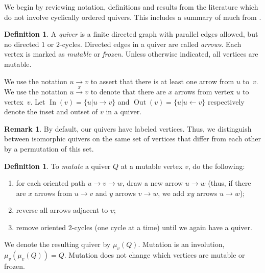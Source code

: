 \documentclass[11pt, letterpaper]{amsart}
\theoremstyle{definition}
\newtheorem{remark}[theorem]{Remark}
\newtheorem{definition}[theorem]{Definition}
\numberwithin{equation}{section}
\def\In{{\operatorname{In}}}
\def\Out{{\operatorname{Out}}}
\begin{document}
We begin by reviewing notation, definitions and results from the literature which do not involve cyclically ordered quivers.
This includes a summary of much from \cite{SevenAMatrices}. 



\begin{definition}
A \emph{quiver} is a finite directed graph with parallel edges allowed, but no directed $1$ or $2$-cycles.
Directed edges in a quiver are called \emph{arrows}.
Each vertex is marked as \emph{mutable} or \emph{frozen}. 
Unless otherwise indicated, all vertices are mutable.

We use the notation $ u \rightarrow v$ to assert that there is at least one arrow from $u$ to~$v$.
We use the notation $u \stackrel{x}{\rightarrow} v$ to denote that there are $x$ arrows from vertex $u$ to vertex~$v$.
Let $\In(v) = \{u | u \rightarrow v\}$ and $\Out(v) = \{u | u \leftarrow v\}$ respectively denote the inset and outset of $v$ in a quiver.
\end{definition}

\begin{remark}
By default, our quivers have labeled vertices. 
Thus, we distinguish between isomorphic quivers on the same set of vertices that differ from each other by a permutation of this set. 
\end{remark}

\begin{definition}
To \emph{mutate} a quiver $Q$ at a mutable vertex $v$, do the following:
\begin{enumerate}
\item for each oriented path $u \rightarrow v \rightarrow w$, draw a new arrow $u \rightarrow w$ (thus, if there are $x$ arrows from $u \rightarrow v$ and $y$ arrows $v \rightarrow w$, we add $xy$ arrows $u \rightarrow w$);
\item reverse all arrows adjacent to $v$;
\item remove oriented $2$-cycles (one cycle at a time) until we again have a quiver. %
\end{enumerate}
We denote the resulting quiver by $\mu_v(Q)$.
Mutation is an involution, $\mu_v ( \mu_v(Q)) = Q$.
Mutation does not change which vertices are mutable or frozen.
\end{definition}
\end{document}
